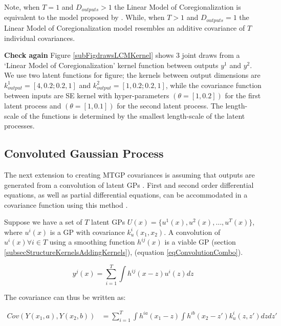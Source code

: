 Note, when $T = 1$ and $D_{outputs} > 1$ the Linear Model of Coregionalization is equivalent to the model proposed by \cite{bonilla2007multi}. While, when $T > 1$ and $D_{outputs} = 1$ the Linear Model of Coregionalization model resembles an additive covariance of $T$ individual covariances.

\textbf{Check again}
Figure \ref{subFigdrawsLCMKernel} shows 3 joint draws from a `Linear Model of Coregionalization' kernel function between outputs $y^{1}$ and $y^{2}$. We use two latent functions for figure; the kernels between output dimensions are $k_{output}^{1} = [4, 0.2; 0.2, 1]$ and $k_{output}^{2} = [1, 0.2; 0.2, 1]$, while the covariance function between inputs are SE kernel with hyper-parameters $(\theta = [1, 0.2])$ for the first latent process and $(\theta = [1, 0.1])$ for the second latent process. The length-scale of the functions is determined by the smallest length-scale of the latent processes.



\subsection{Convoluted Gaussian Process}\label{subsecConvolutedGP}
The next extension to creating MTGP covariances is assuming that outputs are generated from a convolution of latent GPs \cite{higdon2002space, Boyle05dependentgaussian}. First and second order
differential equations, as well as partial differential equations, can be accommodated in a covariance function using this method \cite{journals/jmlr/AlvarezLL09}.

Suppose we have a set of $T$ latent GPs $U(x) = \{u^{1}(x), u^2(x), \ldots, u^{T}(x)\}$, where $u^{i}(x)$ is a GP with covariance $k_{u}^{i}(x_{1}, x_{2})$. A convolution of $u^{i}(x) \forall i \in T$ using a smoothing function $h^{ij}(x)$ is a viable GP (section \ref{subsecStructureKernelsAddingKernels}), (equation \ref{eqConvolutionCombo}).

\begin{equation}\label{eqConvolutionCombo}
y^{j}(x) = \sum_{i=1}^{T} \int h^{ij}(x - z) u^{i}(z) dz
\end{equation}

The covariance can thus be written as:

\begin{equation} \label{eqConvolutionCovariance}
 \begin{aligned}
Cov(Y(x_{1}, a), Y(x_{2}, b)) & = \sum_{i=1}^{T} \int h^{ia}(x_{1} - z) \int h^{ib}(x_{2} - z') k_{u}^{i}(z, z') dz dz'
 \end{aligned}
\end{equation}

